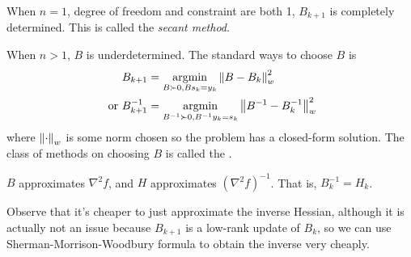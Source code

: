 \documentclass[class=article,crop=false]{standalone}
\begin{document}
		 \begin{eg}
			 When $ n=1$, degree of freedom and constraint are both 1, $ B_{k+1}$ is completely determined. This is called the \emph{secant method}.
		\end{eg}
When $ n>1$,  $ B$ is underdetermined. The standard ways to choose  $ B$ is
 \begin{align*}
	 B_{k+1} &= \operatorname*{argmin}_{B \succ 0, B s_k = y_k} {\left\lVert{ B-B_k}\right\rVert}_w^2 \\
	 \text{ or } B_{k+1}^{-1} &= \operatorname*{argmin}_{B^{-1} \succ 0, B^{-1}y_k=s_k} {\left\lVert{ B^{-1}-B_k^{-1}}\right\rVert}_w^2  
\end{align*}
where $ {\left\lVert{ \cdot }\right\rVert}_w $ is some norm chosen so the problem has a closed-form solution. The class of methods on choosing $ B$ is called the  . 

\begin{notation}
	$ B$ approximates  $ \nabla ^2 f$, and $ H$ approximates  $ (\nabla ^2 f)^{-1}$. That is, $ B_k ^{-1} = H_k$.
\end{notation}

Observe that it's cheaper to just approximate the inverse Hessian, although it is actually not an issue because $ B_{k+1}$ is a low-rank update of $ B_k$, so we can use Sherman-Morrison-Woodbury formula to obtain the inverse very cheaply.
\end{document}
